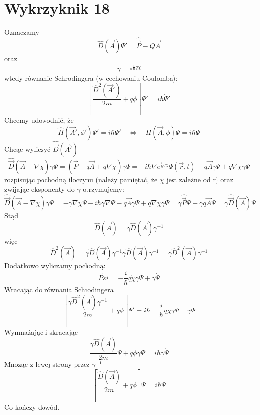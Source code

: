\documentclass[a4paper,12pt]{article}
\begin{document}
\section{Wykrzyknik 18}
Oznaczamy 
\begin{equation*}
  \hat{D} (\vec{A}) \Psi' = \hat{\vec{P}} - Q \vec{A}
\end{equation*}
oraz
\begin{equation*}
  \gamma = e^{\frac{i}{\hbar}q\chi}
\end{equation*}
wtedy równanie Schrodingera (w cechowaniu Coulomba):
\begin{equation*}
  \left[ \frac{\hat{D}^2(\vec{A}')}{2m} + q\phi \right] \Psi' = i \hbar
  \dot{\Psi}'
\end{equation*}
Chcemy udowodnić, że
\begin{equation*}
  \hat{H}(\vec{A}', \phi') \Psi' = i\hbar \Psi' \quad \Leftrightarrow \quad
  H(\vec{A}, \phi) \Psi = i\hbar \Psi
\end{equation*}
Chcąc wyliczyć $\hat{\vec{D}}(\vec{A}')$ 
\begin{equation*}
  \hat{\vec{D}} (\vec{A} - \nabla \chi) \gamma \Psi = \left( \vec{P} - q\vec{A}
  + q\nabla \chi \right) \gamma \Psi = -i \hbar \nabla
  e^{\frac{i}{\hbar}q\chi} \Psi(\vec{r}, t) - q \vec{A} \gamma\Psi + q\nabla\chi
  \gamma \Psi
\end{equation*}
rozpisując pochodną iloczynu (należy pamiętać, że $\chi$ jest zależne od r)
oraz zwijając eksponenty do $\gamma$ otrzymujemy:
\begin{equation*}
  \hat{\vec{D}} (\vec{A} - \nabla \chi) \gamma \Psi = -\gamma \nabla \chi \Psi
  - i\hbar \gamma \nabla \Psi - q\vec{A} \gamma \Psi + q\nabla \chi \gamma \Psi
  = \gamma \hat{\vec{P}} \Psi - \gamma q \vec{A} \Psi = \gamma \hat{\vec{D}}
  (\vec{A}) \Psi
\end{equation*}
Stąd 
\begin{equation*}
  \hat{D}(\vec{A}) = \gamma\hat{D} (\vec{A})\gamma^{-1}
\end{equation*}
więc
\begin{equation*}
  \hat{D}^2 (\vec{A}) = \gamma\hat{D}(\vec{A})\gamma^{-1} \gamma
  \hat{D}(\vec{A}) \gamma^{-1} = \gamma \hat{D}^2(\vec{A}) \gamma^{-1}
\end{equation*}
Dodatkowo wyliczamy pochodną:
\begin{equation*}
  \dot{Psi} = -\frac{i}{\hbar}q \dot{\chi} \gamma\Psi + \gamma\dot{\Psi}
\end{equation*}
Wracając do równania Schrodingera
\begin{equation*}
  \left[ \frac{\gamma \hat{D}^2(\vec{A}) \gamma^{-1}
}{2m} + q\phi \right] \Psi' = i \hbar -\frac{i}{\hbar}q \dot{\chi} \gamma\Psi +
\gamma\dot{\Psi}
\end{equation*}
Wymnażając i skracając
\begin{equation*}
  \frac{\gamma\hat{D}(\vec{A})}{2m}\Psi + q\phi \gamma \Psi = i\hbar \gamma
  \dot{\Psi}
\end{equation*}
Mnożąc z lewej strony przez $\gamma^{-1}$
\begin{equation*}
  \left[ \frac{\hat{D}(\vec{A})}{2m} + q\phi \right]  \Psi = i\hbar 
  \dot{\Psi}
\end{equation*}
Co kończy dowód.
\end{document}
